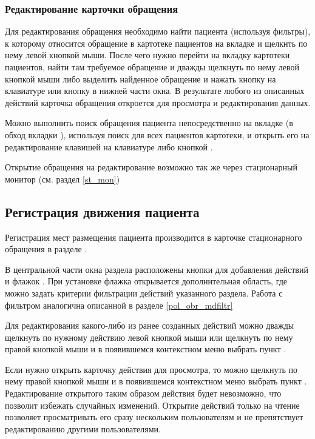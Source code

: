 \subsubsection{Редактирование карточки обращения}

Для редактирования обращения необходимо найти пациента (используя фильтры), к которому относится обращение в картотеке пациентов на вкладке  и щелкнть по нему левой кнопкой мыши. После чего нужно перейти на вкладку  картотеки пациентов, найти там требуемое обращение и дважды щелкнуть по нему левой кнопкой мыши либо выделить найденное обращение и нажать кнопку  на клавиатуре или кнопку  в нижней части окна. В результате любого из описанных действий карточка обращения откроется для просмотра и редактирования данных.

Можно выполнить поиск обращения пациента непосредственно на вкладке  (в обход вкладки ), используя поиск для всех пациентов картотеки, и открыть его на редактирование клавишей  на клавиатуре либо кнопкой . 

Открытие обращения на редактирование возможно так же через стационарный монитор (см. раздел \ref{st_mon})

\subsection{Регистрация движения пациента}

Регистрация мест размещения пациента производится в карточке стационарного обращения в разделе .

В центральной части окна раздела расположены кнопки для добавления действий и флажок . При установке флажка открывается дополнительная область, где можно задать критерии фильтрации действий указанного раздела. Работа с фильтром аналогична описанной в разделе \ref{pol_obr_mdfiltr}

Для редактирования какого-либо из ранее созданных действий можно дважды щелкнуть по нужному действию левой кнопкой мыши или щелкнуть по нему правой кнопкой мыши и в появившемся контекстном меню выбрать пункт .

\begin{prim}
Если нужно открыть карточку действия для просмотра, то можно щелкнуть по нему правой кнопкой мыши и в появившемся контекстном меню выбрать пункт . Редактирование открытого таким образом действия будет невозможно, что позволит избежать случайных изменений. Открытие действий только на чтение позволяет просматривать его сразу нескольким пользователям и не препятствует редактированию другими пользователями.
\end{prim}

